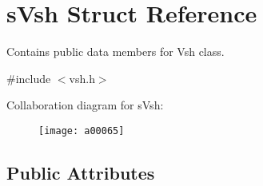 \section{s\-Vsh Struct Reference}
\label{a00007}


Contains public data members for Vsh class.  




{\ttfamily \#include $<$vsh.\-h$>$}



Collaboration diagram for s\-Vsh\-:\nopagebreak
\begin{figure}[H]
\begin{center}
\leavevmode
\texttt{[image: a00065]}
\end{center}
\end{figure}
\subsection*{Public Attributes}
